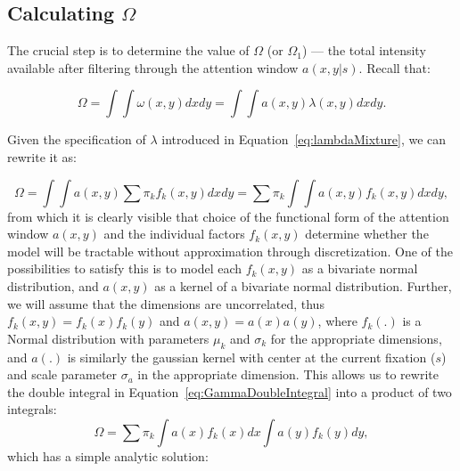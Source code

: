 \documentclass{article}
\begin{document}
\subsection{Calculating \texorpdfstring{$\Omega$}{Omega}}

The crucial step is to determine the value of $\Omega$ (or $\Omega_1$) --- the total intensity available after filtering through the attention window $a(x, y | s)$. Recall that: 

\begin{equation}
    \Omega = \int \int \omega(x, y) dx dy=  \int \int a(x, y) \lambda(x, y)dx dy.
\end{equation}

Given the specification of $\lambda$ introduced in Equation~\ref{eq:lambdaMixture}, we can rewrite it as:

\begin{equation}
\label{eq:GammaDoubleIntegral}
    \Omega = \int \int a(x, y) \sum \pi_k f_k(x, y) dx dy = \sum \pi_k \int \int a(x, y) f_k(x, y) dx dy,
\end{equation}
from which it is clearly visible that choice of the functional form of the attention window $a(x, y)$ and the individual factors $f_k(x, y)$ determine whether the model will be tractable without approximation through discretization. One of the possibilities to satisfy this is to model each $f_k(x, y)$ as a bivariate normal distribution, and $a(x, y)$ as a kernel of a bivariate normal distribution. Further, we will assume that the dimensions are uncorrelated, thus $f_k(x, y) = f_k(x)f_k(y)$ and $a(x, y) = a(x)a(y)$, where $f_k(.)$ is a Normal distribution with parameters $\mu_k$ and $\sigma_k$ for the appropriate dimensions, and $a(.)$ is similarly the gaussian kernel with center at the current fixation ($s$) and scale parameter $\sigma_a$ in the appropriate dimension. This allows us to rewrite the double integral in Equation~\ref{eq:GammaDoubleIntegral} into a product of two integrals:
\begin{equation}
    \Omega =  \sum \pi_k \int a(x)f_k(x) dx \int a(y)f_k(y) dy, 
\end{equation}
which has a simple analytic solution:
\end{document}
